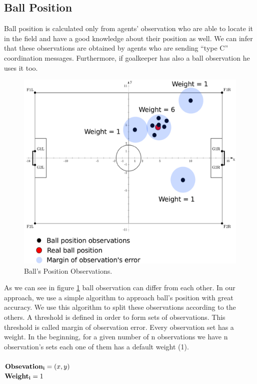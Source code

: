 \subsection{Ball Position}
Ball position is calculated only from agents' observation who are able to locate it in the field and have a good knowledge about their position as well. We can infer that these observations are obtained by agents who are sending ``type C'' coordination messages. Furthermore, if goalkeeper has also a ball observation he uses it too.
\begin{figure}[htb!]
\centering
  \includegraphics[scale=0.5]{Chapter4/figures/Ball.pdf}
  \caption{Ball's Position Observations.} 
  \label{fig:Ball}
\end{figure}
As we can see in figure \ref{fig:Ball} ball observation can differ from each other. In our approach, we use a simple algorithm to approach ball's position with great accuracy. We use this algorithm to split these observations according to the others. A threshold is defined in order to form sets of observations. This threshold is called margin of observation error. Every observation set has a weight. In the beginning, for a given number of n observations we have n observation's sets each one of them has a default weight (1).\\
\\
${\bf Obsevation_{i} } = (x,y)$\\
${\bf Weight_{i}} = 1$\\
\\
